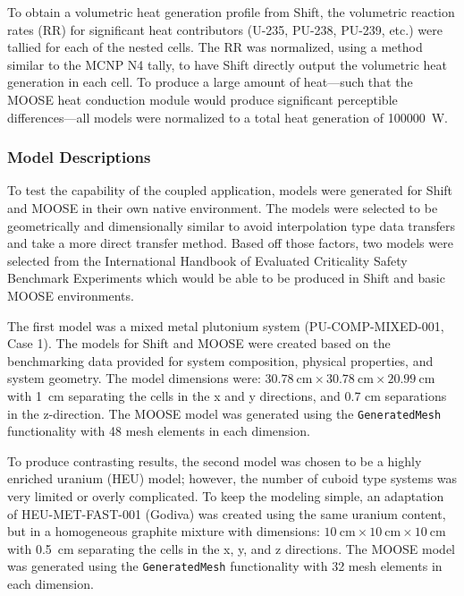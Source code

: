 \documentclass{anstrans}
\begin{document}
To obtain a volumetric heat generation profile from Shift, the volumetric reaction rates (RR) for significant heat contributors (U-235, PU-238, PU-239, etc.) were tallied for each of the nested cells. The RR was normalized, using a method similar to the MCNP N4 tally, to have Shift directly output the volumetric heat generation in each cell. To produce a large amount of heat---such that the MOOSE heat conduction module would produce significant perceptible differences---all models were normalized to a total heat generation of \SI{100000}{\watt}. 

\subsubsection{Model Descriptions}
To test the capability of the coupled application, models were generated for Shift and MOOSE in their own native environment. The models were selected to be geometrically and dimensionally similar to avoid interpolation type data transfers and take a more direct transfer method. Based off those factors, two models were selected from the International Handbook of Evaluated Criticality Safety Benchmark Experiments \cite{CritHandbook} which would be able to be produced in Shift and basic MOOSE environments. 

The first model was a mixed metal plutonium system (PU-COMP-MIXED-001, Case 1). The models for Shift and MOOSE were created based on the benchmarking data provided for system composition, physical properties, and system geometry. The model dimensions were: $\SI{30.78}{\centi\meter} \times \SI{30.78}{\centi\meter} \times \SI{20.99}{\centi\meter}$ with \SI{1}{\centi\meter} separating the cells in the x and y directions, and 0.7 cm separations in the z-direction. The MOOSE model was generated using the \texttt{GeneratedMesh} functionality with 48 mesh elements in each dimension. 

To produce contrasting results, the second model was chosen to be a highly enriched uranium (HEU) model; however, the number of cuboid type systems was very limited or overly complicated. To keep the modeling simple, an adaptation of HEU-MET-FAST-001 (Godiva) was created using the same uranium content, but in a homogeneous graphite mixture with dimensions: $\SI{10}{\centi\meter} \times \SI{10}{\centi\meter} \times \SI{10}{\centi\meter}$ with \SI{0.5}{\centi\meter} separating the cells in the x, y, and z directions. The MOOSE model was generated using the \texttt{GeneratedMesh} functionality with 32 mesh elements in each dimension. 
\end{document}
